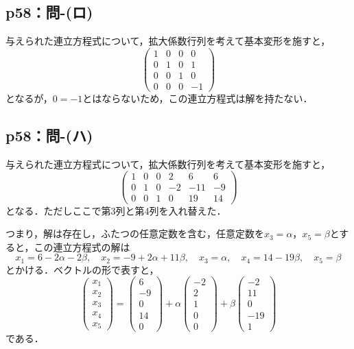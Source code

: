 \documentclass[a4paper,10pt,fleqn]{ltjsarticle}
\begin{document}
\subsection*{p58：問-(ロ)}

\begin{tleftbar}
  与えられた連立方程式について，拡大係数行列を考えて基本変形を施すと，
  \[
    \begin{pmatrix} 1 & 0 & 0 & 0 \\ 0 & 1& 0 & 1 \\ 0 & 0 & 1 & 0 \\ 0 & 0 & 0 & -1 \end{pmatrix}
  \]
  となるが，$0 = -1$とはならないため，この連立方程式は解を持たない．
\end{tleftbar}

\subsection*{p58：問-(ハ)}

\begin{tleftbar}
  与えられた連立方程式について，拡大係数行列を考えて基本変形を施すと，
  \[
    \begin{pmatrix} 1 & 0 & 0 & 2 & 6 & 6 \\ 0 & 1& 0 & -2 & -11 & -9 \\ 0 & 0 & 1 & 0 & 19 & 14 \end{pmatrix}
  \]
  となる．ただしここで第3列と第4列を入れ替えた．

  つまり，解は存在し，ふたつの任意定数を含む，任意定数を$x_3 = \alpha$，$x_5 = \beta$とすると，この連立方程式の解は
  \[
    x_1 = 6-2\alpha -2 \beta , \quad x_2 = -9 + 2\alpha +11 \beta , \quad x_3 = \alpha , \quad x_4 = 14-19\beta,\quad x_5 =\beta
  \]
  とかける．ベクトルの形で表すと，
  \[
    \begin{pmatrix} x_1 \\ x_2 \\ x_3 \\ x_4 \\ x_5 \end{pmatrix} = \begin{pmatrix} 6 \\ -9 \\ 0 \\ 14 \\ 0 \end{pmatrix} + \alpha \begin{pmatrix} -2 \\ 2 \\ 1 \\ 0 \\ 0 \end{pmatrix} + \beta \begin{pmatrix} -2 \\ 11 \\ 0 \\ -19 \\ 1 \end{pmatrix}
  \]
  である．
\end{tleftbar}
\end{document}
